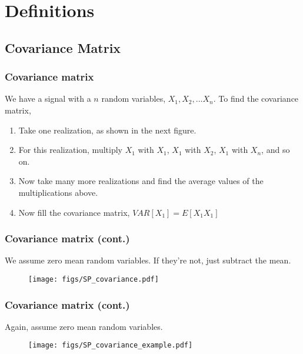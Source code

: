 \section{Definitions}

\subsection{Covariance Matrix}
\begin{frame}
\frametitle{Covariance matrix}
\logoEvolution\mypagenum
	We have a signal with a $n$ random variables, $X_1, X_2, ... X_n$.  To find the covariance matrix,
	\begin{enumerate}
		\item Take one realization, as shown in the next figure.
		\item For this realization, multiply $X_1$ with $X_1$, $X_1$ with $X_2$, $X_1$ with $X_n$, and so on.
		\item Now take many more realizations and find the average values of the multiplications above.
		\item Now fill the covariance matrix, $VAR[X_1] = E[X_1X_1]$
	\end{enumerate}
\end{frame}




\begin{frame}
\frametitle{Covariance matrix (cont.)}
\logoEvolution\mypagenum
	We assume zero mean random variables.  If they're not, just subtract the mean.	
	\begin{figure}
		\centering
		\texttt{[image: figs/SP\_covariance.pdf]}
		\label{fig:Covariance}
	\end{figure}
\end{frame}



\begin{frame}\frametitle{Covariance matrix (cont.)}\logoEvolution\mypagenum
	Again, assume zero mean random variables.
	\begin{figure}
		\texttt{[image: figs/SP\_covariance\_example.pdf]}
	\end{figure}
\end{frame}



